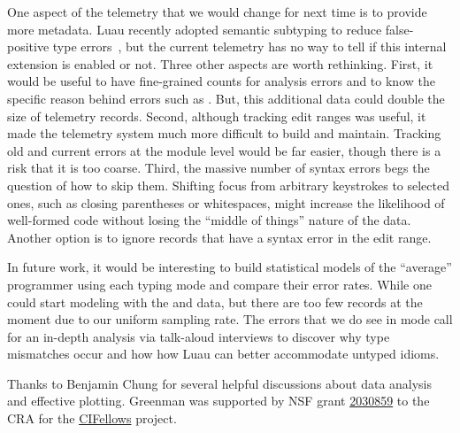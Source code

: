 \documentclass[english,submission,cleveref]{programming}
\begin{document}
One aspect of the telemetry that we would change for next time is to provide
more metadata.
Luau recently adopted semantic subtyping to reduce false-positive type
errors~\cite{CF05:GentleIntroduction,Jef22:SemanticSubtyping}, but the current
telemetry has no way to tell if this
internal extension is enabled or not.
Three other aspects are worth rethinking.
First, it would be useful to have fine-grained counts for \FS{} analysis
errors and to know the specific reason behind errors such as .
But, this additional data could double the size of telemetry records.
Second, although tracking edit ranges was useful, it made the telemetry system
much more difficult to build and maintain.
Tracking old and current errors at the module level would be far easier,
though there is a risk that it is too coarse.
Third, the massive number of syntax errors begs the question of how to skip
them.
Shifting focus from arbitrary keystrokes to selected ones, such as closing
parentheses or whitespaces, might increase the likelihood of well-formed
code without losing the ``middle of things'' nature of the data.
Another option is to ignore records that have a syntax error in the edit range.

In future work, it would be interesting to build statistical models of
the ``average'' programmer using each typing mode and compare their error
rates.
While one could start modeling with the \mnocheck{} and \mnonstrict{}
data, but there are too few \mstrict{} records at the moment due to our uniform
sampling rate.
The errors that we do see in \mstrict{} mode call for an in-depth analysis via
talk-aloud interviews to discover why type mismatches occur and how how Luau
can better accommodate untyped idioms.




\acks

Thanks to Benjamin Chung for several helpful discussions about data analysis
and effective plotting.
Greenman was supported by
NSF grant \href{https://nsf.gov/awardsearch/showAward?AWD_ID=2030859&HistoricalAwards=false}{2030859}
to the CRA for the \href{https://cifellows2020.org}{CIFellows} project.

%
%
%
%
%
%


\end{document}
